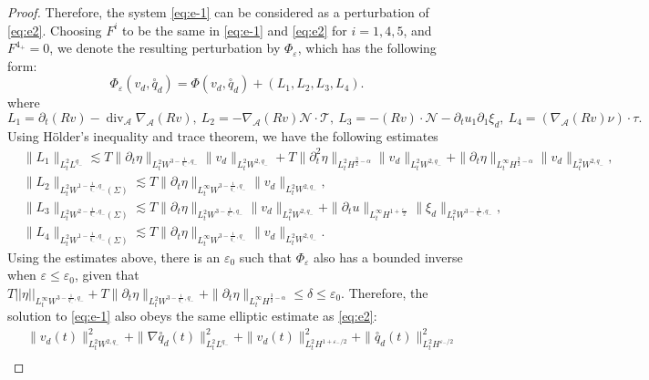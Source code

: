 \documentclass[letterpaper,reqno,10pt,twoside]{amsart}
\theoremstyle{definition}
\theoremstyle{remark}
\def\p{\partial}
\begin{document}
\begin{proof}
		Therefore, the system \eqref{eq:e-1} can be considered as a perturbation of \eqref{eq:e2}. Choosing $F^{i}$ to be the same in \eqref{eq:e-1} and \eqref{eq:e2} for $i=1,4,5$, and $F^{4_{+}}=0$, we denote the resulting perturbation by $\Phi_{\varepsilon}$, which has the following form:
		\[
		\Phi_{\varepsilon}(v_{d},\overset{\circ}q_{d})=\Phi(v_{d},\overset{\circ}q_{d})+(L_{1},L_{2},L_{3},L_{4}).
		\]
		\noindent where
		\[
		L_{1}=\p_{t}(Rv)-\operatorname{div}_{\mathcal{A}}\nabla_{\mathcal{A}}(Rv),\
		L_{2}=-\nabla_{\mathcal{A}}(Rv)\mathcal{N}\cdot \mathcal{T},\
		L_{3}=-(Rv)\cdot \mathcal{N}-\p_{t}u_{1}\p_{1}\xi_{d},\
		L_{4}=(\nabla_{\mathcal{A}}(Rv)\nu)\cdot \tau.
		\]
		\noindent Using H\"older's inequality and trace theorem, we have the following estimates
		\[
		\begin{aligned}
			& \|L_{1}\|_{L_{t}^{2}L^{q_{-}}}\lesssim T\|\p_{t}{\eta}\|_{L_{t}^{2}W^{3-\frac{1}{q_{-}},q_{-}}}\|v_{d}\|_{L_{t}^{2}W^{2,q_{-}}}+T\|\p_{t}^{2}{\eta}\|_{L_{t}^{2}H^{\frac{3}{2}-\alpha}}\|v_{d}\|_{L_{t}^{2}W^{2,q_{-}}}+\|\p_{t}\eta\|_{L_{t}^{\infty}H^{\frac{3}{2}-\alpha}}\|v_{d}\|_{L_{t}^{2}W^{2,q_{-}}},\\
			& \|L_{2}\|_{L_{t}^{2}W^{1-\frac{1}{q_{-}},q_{-}}(\Sigma)}\lesssim T\|\p_{t}\eta\|_{L_{t}^{\infty}W^{3-\frac{1}{q_{-}},q_{-}}}\|v_{d}\|_{L_{t}^{2}W^{2,q_{-}}},\\
			&\|L_{3}\|_{L_{t}^{2}W^{2-\frac{1}{q_{-}},q_{-}}(\Sigma)}\lesssim T\|\p_{t}\eta\|_{L_{t}^{2}W^{3-\frac{1}{q_{-}},q_{-}}}\|v_{d}\|_{L_{t}^{2}W^{2,q_{-}}}+\|\p_{t}u\|_{L_{t}^{\infty}H^{1+\frac{\varepsilon_{-}}{2}}}\|\xi_{d}\|_{L_{t}^{2}W^{3-\frac{1}{q_{-}},q_{-}}},\\
			&\|L_{4}\|_{L_{t}^{2}W^{1-\frac{1}{q_{-}},q_{-}}(\Sigma)}\lesssim T\|\p_{t}\eta\|_{L_{t}^{\infty}W^{3-\frac{1}{q_{-}},q_{-}}}\|v_{d}\|_{L_{t}^{2}W^{2,q_{-}}}.
		\end{aligned}
		\]
		\noindent
		Using the estimates above, there is an $\varepsilon_{0}$ such that $\Phi_{\varepsilon}$ also has a bounded inverse when $\varepsilon\leq \varepsilon_{0}$, given that $T\vert \vert \eta\vert \vert_{L_{t}^{\infty}W^{3-\frac{1}{q_{-}},q_{-}}}+T\|\p_{t}\eta\|_{L_{t}^{2}W^{3-\frac{1}{q_{-}},q_{-}}}+\|\p_{t}\eta\|_{L_{t}^{\infty}H^{\frac{3}{2}-\alpha}}\leq \delta \leq\varepsilon_{0}$. Therefore, the solution to \eqref{eq:e-1} also obeys the same elliptic estimate as \eqref{eq:e2}:
		\begin{equation}\label{est:bound_vq1}
			\begin{aligned}
				&\|v_{d}(t)\|_{L_{t}^{2}W^{2,q_-}}^2+\|\nabla \overset{\circ}q_{d}(t)\|_{L_{t}^{2}L^{q_-}}^2 + \|v_{d}(t)\|_{L_{t}^{2}H^{1+\varepsilon_-/2}}^2 + \|\overset{\circ}q_{d}(t)\|_{L_{t}^{2}H^{\varepsilon_-/2}}^2\\

\end{aligned}
\end{equation}
\end{proof}
\end{document}
